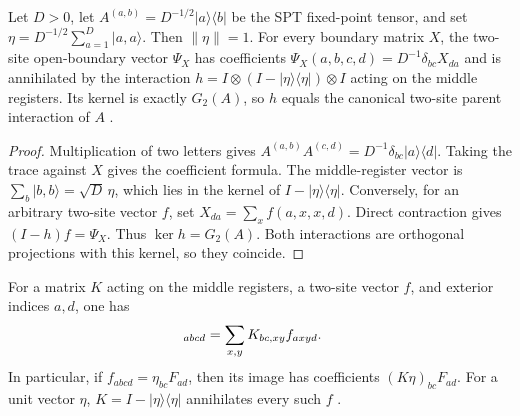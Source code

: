 \begin{lemma}
    \label{thm:spt_fixed_point_two_site_bond_kernel}
    \leanok
    Let $D>0$, let $A^{(a,b)}=D^{-1/2}|a\rangle\langle b|$ be the SPT
    fixed-point tensor, and set
    $\eta=D^{-1/2}\sum_{a=1}^D|a,a\rangle$. Then $\|\eta\|=1$.
    For every boundary matrix $X$, the two-site open-boundary vector
    $\Psi_X$ has coefficients
    $\Psi_X(a,b,c,d)=D^{-1}\delta_{bc}X_{da}$ and is annihilated by
    the interaction $h=I\otimes(I-|\eta\rangle\langle\eta|)\otimes I$
    acting on the middle registers. Its kernel is exactly $G_2(A)$, so
    $h$ equals the canonical two-site parent interaction of $A$
    \cite[Section~II.D.2]{Schuch2011Phases}.
\end{lemma}

\begin{proof}\leanok
    Multiplication of two letters gives
    $A^{(a,b)}A^{(c,d)}=D^{-1}\delta_{bc}|a\rangle\langle d|$.
    Taking the trace against $X$ gives the coefficient formula.
    The middle-register vector is $\sum_b|b,b\rangle=\sqrt D\,\eta$,
    which lies in the kernel of $I-|\eta\rangle\langle\eta|$.
    Conversely, for an arbitrary two-site vector $f$, set
    $X_{da}=\sum_x f(a,x,x,d)$. Direct contraction gives
    $(I-h)f=\Psi_X$. Thus $\ker h=G_2(A)$.
    Both interactions are orthogonal projections with this kernel,
    so they coincide.
\end{proof}

\begin{lemma}
    \label{thm:spt_middle_bond_contraction}
    \leanok
    For a matrix $K$ acting on the middle registers, a two-site vector
    $f$, and exterior indices $a,d$, one has
    \begin{align}
        [(I\otimes K\otimes I)f]_{abcd}
         & =\sum_{x,y}K_{bc,xy}f_{axyd}.\notag
    \end{align}
    In particular, if $f_{abcd}=\eta_{bc}F_{ad}$, then its image has
    coefficients $(K\eta)_{bc}F_{ad}$. For a unit vector $\eta$,
    $K=I-|\eta\rangle\langle\eta|$ annihilates every such $f$
    \cite[Section~II.D.2]{Schuch2011Phases}.
\end{lemma}

